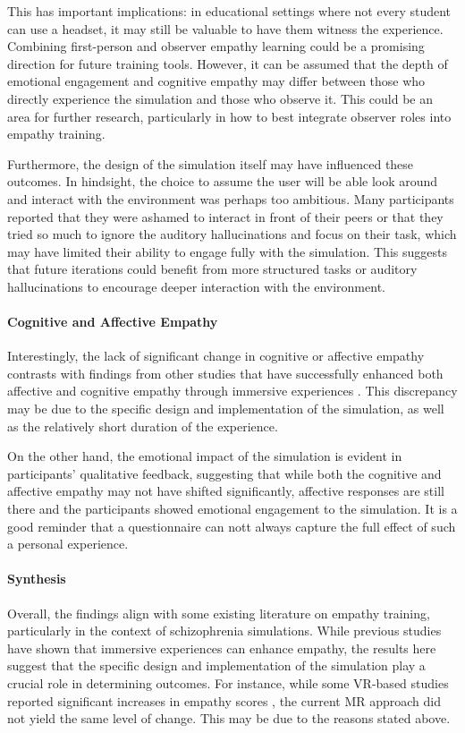 This has important implications: in educational settings where not every student can use a headset, it may still be valuable to have them witness the experience. Combining first-person and observer empathy learning could be a promising direction for future training tools. However, it can be assumed that the depth of emotional engagement and cognitive empathy may differ between those who directly experience the simulation and those who observe it. This could be an area for further research, particularly in how to best integrate observer roles into empathy training. 

\vspace{1em}

Furthermore, the design of the simulation itself may have influenced these outcomes. In hindsight, the choice to assume the user will be able look around and interact with the environment was perhaps too ambitious. Many participants reported that they were ashamed to interact in front of their peers or that they tried so much to ignore the auditory hallucinations and focus on their task, which may have limited their ability to engage fully with the simulation. This suggests that future iterations could benefit from more structured tasks or auditory hallucinations to encourage deeper interaction with the environment.

\paragraph{Cognitive and Affective Empathy}
Interestingly, the lack of significant change in cognitive or affective empathy contrasts with findings from other studies that have successfully enhanced both affective and cognitive empathy through immersive experiences \cite{Rueda2020, Ando2011}. This discrepancy may be due to the specific design and implementation of the simulation, as well as the relatively short duration of the experience.

On the other hand, the emotional impact of the simulation is evident in participants' qualitative feedback, suggesting that while both the cognitive and affective empathy may not have shifted significantly, affective responses are still there and the participants showed emotional engagement to the simulation. It is a good reminder that a questionnaire can nott always capture the full effect of such a personal experience.

\paragraph{Synthesis}
Overall, the findings align with some existing literature on empathy training, particularly in the context of schizophrenia simulations. While previous studies have shown that immersive experiences can enhance empathy, the results here suggest that the specific design and implementation of the simulation play a crucial role in determining outcomes. For instance, while some VR-based studies reported significant increases in empathy scores \cite{Martingano2021, Ventura2020}, the current MR approach did not yield the same level of change. This may be due to the reasons stated above.


